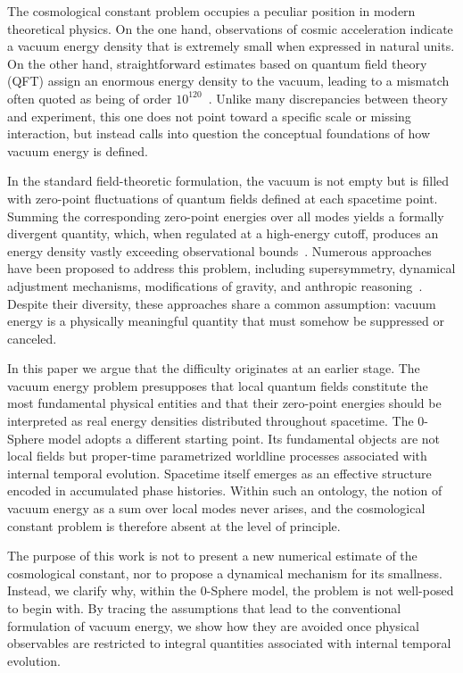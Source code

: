 \documentclass[%
 reprint,
 amsmath,amssymb,
 aps,
 prb,
]{revtex4-2}
\numberwithin{equation}{section}
\begin{document}
The cosmological constant problem occupies a peculiar position in modern theoretical physics. On the one hand, observations of cosmic acceleration indicate a vacuum energy density that is extremely small when expressed in natural units. On the other hand, straightforward estimates based on quantum field theory (QFT) assign an enormous energy density to the vacuum, leading to a mismatch often quoted as being of order $10^{120}$~\cite{Zeldovich1967,Weinberg1989,Padmanabhan2003,Martin2012}. Unlike many discrepancies between theory and experiment, this one does not point toward a specific scale or missing interaction, but instead calls into question the conceptual foundations of how vacuum energy is defined.

In the standard field-theoretic formulation, the vacuum is not empty but is filled with zero-point fluctuations of quantum fields defined at each spacetime point. Summing the corresponding zero-point energies over all modes yields a formally divergent quantity, which, when regulated at a high-energy cutoff, produces an energy density vastly exceeding observational bounds~\cite{BirrellDavies1982,Fulling1989}. Numerous approaches have been proposed to address this problem, including supersymmetry, dynamical adjustment mechanisms, modifications of gravity, and anthropic reasoning~\cite{Weinberg1989,Padmanabhan2003}. Despite their diversity, these approaches share a common assumption: vacuum energy is a physically meaningful quantity that must somehow be suppressed or canceled.

In this paper we argue that the difficulty originates at an earlier stage. The vacuum energy problem presupposes that local quantum fields constitute the most fundamental physical entities and that their zero-point energies should be interpreted as real energy densities distributed throughout spacetime. The 0-Sphere model adopts a different starting point. Its fundamental objects are not local fields but proper-time parametrized worldline processes associated with internal temporal evolution. Spacetime itself emerges as an effective structure encoded in accumulated phase histories. Within such an ontology, the notion of vacuum energy as a sum over local modes never arises, and the cosmological constant problem is therefore absent at the level of principle.

The purpose of this work is not to present a new numerical estimate of the cosmological constant, nor to propose a dynamical mechanism for its smallness. Instead, we clarify why, within the 0-Sphere model, the problem is not well-posed to begin with. By tracing the assumptions that lead to the conventional formulation of vacuum energy, we show how they are avoided once physical observables are restricted to integral quantities associated with internal temporal evolution.
\end{document}
